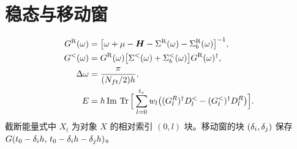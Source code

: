 \section{稳态与移动窗}
\begin{align}
    G^{\mathrm{R}}(\omega) &= \big[\omega+\mu-\bm{H}
        -\Sigma^{\mathrm{R}}(\omega)-\Sigma^{\mathrm{R}}_b(\omega)\big]^{-1},\\
    G^{<}(\omega) &= G^{\mathrm{R}}(\omega)
        \big[\Sigma^{<}(\omega)+\Sigma^{<}_b(\omega)\big]
        G^{\mathrm{R}}(\omega)^{\dagger},\\
    \Delta\omega &= \frac{\pi}{(N_{ft}/2)h},\\
    E &= h\,\mathrm{Im}\,\operatorname{Tr}\Big[\sum_{l=0}^{t_c}w_l
        \big((G_l^R)^\dagger D_l^<-(G_l^<)^\dagger D_l^R\big)\Big].
\end{align}
截断能量式中 $X_l$ 为对象 $X$ 的相对索引 $(0,l)$ 块。移动窗的块 $(\delta_i,\delta_j)$ 保存
$G(t_0-\delta_i h,\,t_0-\delta_i h-\delta_j h)$。
